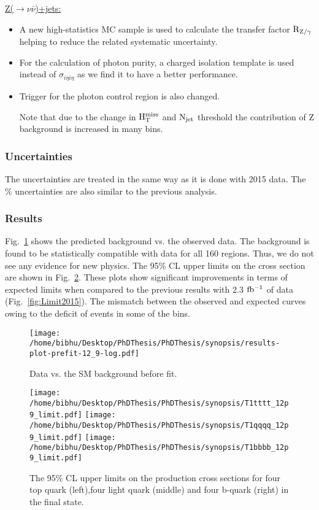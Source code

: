 \underline{Z($\rightarrow \nu \bar{\nu}$)+jets: } 

\begin{itemize}

\item A new high-statistics MC sample is used to calculate the transfer factor $\rm R_{Z/\gamma}$ helping to  reduce the related systematic uncertainty.

\item For the calculation of photon purity, a charged isolation template is used instead of $\sigma_{i\eta i\eta}$ as we find it to have a better performance.

\item Trigger for the photon control region is also changed. 

Note that due to the change in $\rm H_{T}^{miss}$ and $\rm N_{jet}$ threshold the contribution of Z background is increased in many bins.

\end{itemize}

\subsubsection{Uncertainties}

The uncertainties are treated in the same way as it is done with 2015 data. The $\%$ uncertainties are also similar to the previous analysis.




\subsubsection{Results}
Fig.~\ref{fig:Datavsbkg2016} shows the predicted background vs. the observed data. The background is found to be statistically compatible with data for all 160 regions. Thus, we do not see any evidence for new physics. The  95\% CL upper limits on the cross section are shown in Fig.~\ref{fig:Limit2016Synop}. These plots show significant improvements in terms of expected limits when compared to the previous results with 2.3 $\rm fb^{-1}$ of data (Fig.~\ref{fig:Limit2015}). The mismatch between the observed and expected curves owing to the deficit of events in some of the bins.   
\begin{figure}
\centering
\texttt{[image: /home/bibhu/Desktop/PhDThesis/PhDThesis/synopsis/results-plot-prefit-12\_9-log.pdf]}
\caption{\label{fig:Datavsbkg2016} Data vs. the SM background before fit.}
\end{figure}
\begin{figure}[h]
\centering
\texttt{[image: /home/bibhu/Desktop/PhDThesis/PhDThesis/synopsis/T1tttt\_12p9\_limit.pdf]}
\texttt{[image: /home/bibhu/Desktop/PhDThesis/PhDThesis/synopsis/T1qqqq\_12p9\_limit.pdf]}
\texttt{[image: /home/bibhu/Desktop/PhDThesis/PhDThesis/synopsis/T1bbbb\_12p9\_limit.pdf]}
\caption{\label{fig:Limit2016Synop}The 95\% CL upper limits on the production cross sections for four top quark (left),four light quark (middle) and four b-quark (right) in the final state.}
\end{figure}





